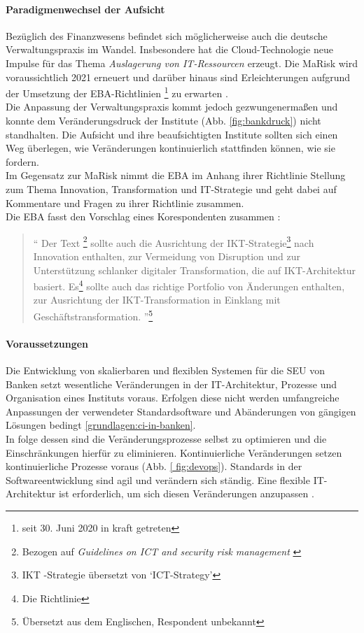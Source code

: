 \paragraph{Paradigmenwechsel der Aufsicht}
Bezüglich des Finanzwesens befindet sich möglicherweise auch die deutsche Verwaltungspraxis im Wandel. Insbesondere hat die Cloud-Technologie neue Impulse für das Thema \emph{Auslagerung von IT-Ressourcen \cite{MaRisk:2017, BAIT:2018}} erzeugt. Die \ac{MaRisk} wird voraussichtlich 2021 erneuert und darüber hinaus sind Erleichterungen aufgrund der Umsetzung der EBA-Richtlinien \cite{eba:2019}\footnote{seit 30. Juni 2020 in kraft getreten} zu erwarten \cite{BaFin:marisk-novelle}. 
\medskip
\\
Die Anpassung der Verwaltungspraxis kommt jedoch gezwungenermaßen und konnte dem Veränderungsdruck der Institute (Abb. \ref{fig:bankdruck}) nicht standhalten. Die Aufsicht und ihre beaufsichtigten Institute sollten sich einen Weg überlegen, wie Veränderungen kontinuierlich stattfinden können, wie sie \citet{Bussmann2006} fordern.
\medskip
\\
Im Gegensatz zur \ac{MaRisk} nimmt die \ac{EBA} im Anhang ihrer Richtlinie \cite{eba:2019} Stellung zum Thema Innovation, Transformation und IT-Strategie und geht dabei auf Kommentare und Fragen zu ihrer Richtlinie zusammen.
\medskip
\\
Die \ac{EBA} fasst den Vorschlag eines Korespondenten zusammen \cite[S. 50]{eba:2019}:
\begin{quote}
    \enquote{
Der Text
\footnote{Bezogen auf \emph{Guidelines on ICT and security risk
management
} \cite[S. 14ff]{eba:2019}} 
sollte auch die Ausrichtung der IKT-Strategie\footnote{\ac{IKT} -Strategie übersetzt von \enquote{ICT-Strategy}} nach Innovation enthalten, zur Vermeidung von Disruption und zur Unterstützung schlanker digitaler Transformation, die auf \ac{IKT}-Architektur basiert. Es\footnote{Die Richtlinie} sollte auch das richtige Portfolio von Änderungen enthalten, zur Ausrichtung der \ac{IKT}-Transformation in Einklang mit Geschäftstransformation.
    }\footnote{Übersetzt aus dem Englischen, Respondent unbekannt}
\end{quote}

\paragraph{Voraussetzungen}
Die Entwicklung von skalierbaren und flexiblen Systemen für die \ac{SEU} von Banken setzt wesentliche Veränderungen in der IT-Architektur, Prozesse und Organisation eines Instituts voraus. Erfolgen diese nicht werden umfangreiche Anpassungen der verwendeter Standardsoftware und Abänderungen von gängigen Lösungen bedingt \ref{grundlagen:ci-in-banken}.
\medskip
\\
In folge dessen sind die Veränderungsprozesse selbst zu optimieren und die Einschränkungen hierfür zu eliminieren. Kontinuierliche Veränderungen setzen kontinuierliche Prozesse voraus (Abb. \ref{ fig:devops}). Standards in der Softwareentwicklung sind agil und verändern sich ständig. Eine flexible IT-Architektur ist erforderlich, um sich diesen Veränderungen anzupassen \cite{Bussmann2006}.

